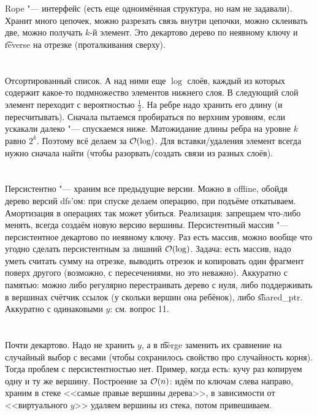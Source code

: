 \section{} %
Rope "--- интерфейс (есть еще одноимённая структура, но нам не задавали).
Хранит много цепочек, можно разрезать связь внутри цепочки, можно склеивать две, можно получать $k$-й элемент.
Это декартово дерево по неявному ключу и \t{reverse} на отрезке (проталкивания сверху).

\section{} %
Отсортированный список.
А над ними еще $\log$ слоёв, каждый из которых содержит какое-то подмножество элементов нижнего слоя.
В следующий слой элемент переходит с вероятностью $\frac 1 2$.
На ребре надо хранить его длину (и пересчитывать).
Сначала пытаемся пробираться по верхним уровням, если ускакали далеко "--- спускаемся ниже.
Матожидание длины ребра на уровне $k$ равно $2^k$.
Поэтому всё делаем за $\mathcal{O}(\log)$.
Для вставки/удаления элемент всегда нужно сначала найти (чтобы разорвать/создать связи из разных слоёв).

\section{} %
Персистентно "--- храним все предыдущие версии.
Можно в offline, обойдя дерево версий dfs'ом: при спуске делаем операцию, при подъёме откатываем.
Амортизация в операциях так может убиться.
Реализация: запрещаем что-либо менять, всегда создаём новую версию вершины.
Персистентный массив "--- персистентное декартово по неявному ключу.
Раз есть массив, можно вообще что угодно сделать персистентным за лишний $\mathcal{O}(\log)$.
Задача: есть массив, надо уметь считать сумму на отрезке, выводить отрезок и копировать
один фрагмент поверх другого (возможно, с пересечениями, но это неважно).
Аккуратно с памятью: можно либо регулярно перестраивать дерево с нуля, либо поддерживать
в вершинах счётчик ссылок (у скольки вершин она ребёнок), либо \t{shared\_ptr}.
Аккуратно с одинаковыми $y$: см. вопрос 11.

\section{} %
\TODO

\section{} %
Почти декартово.
Надо не хранить $y$, а в \t{merge} заменить их сравнение на случайный выбор с весами
(чтобы сохранилось свойство про случайность корня).
Тогда проблем с персистентностью нет.
Пример, когда есть: кучу раз копируем одну и ту же вершину.
Построение за $\mathcal{O}(n)$: идём по ключам слева направо, храним в стеке <<самые правые вершины дерева>>,
в зависимости от <<виртуального $y$>> удаляем вершины из стека, потом привешиваем.

\section{} %
\TODO

\section{} %
\TODO
